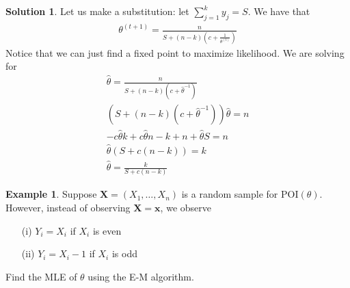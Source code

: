 \documentclass[11pt]{amsart}
\theoremstyle{definition}
\newtheorem{example}[theorem]{Example}
\newtheorem{solution}[theorem]{Solution}
\numberwithin{equation}{section}
\begin{document}
\begin{solution}
    Let us make a substitution: let $\sum_{j=1}^ky_j=S$. We have that
    \begin{align*}
        \theta^{(t+1)}=\frac{n}{S+(n-k)(c+\frac{1}{\theta^{(t)}})}
    \end{align*}
    Notice that we can just find a fixed point to maximize likelihood. We are solving for
    \begin{align*}
        \hat\theta=\frac{n}{S+(n-k)(c+\hat\theta^{-1})}\\
        (S+(n-k)(c+\hat\theta^{-1}))\hat\theta=n\\
        -c \hat\theta k + c \hat\theta n - k + n + \hat\theta S=n\\
        \hat\theta(S+c(n-k))=k\\
        \hat\theta=\frac{k}{S+c(n-k)}
    \end{align*}
\end{solution}
\begin{example}
    Suppose $\mathbf X=(X_1,\ldots,X_n)$ is a random sample for $\mathrm{POI}(\theta)$. However, instead of observing $\mathbf X=\mathbf x$, we observe
    \begin{enumerate}
        \item [(i)] $Y_i=X_i$ if $X_i$ is even
        \item [(ii)] $Y_i=X_i-1$ if $X_i$ is odd
    \end{enumerate}
    Find the MLE of $\theta$ using the E-M algorithm.
\end{example}
\end{document}
